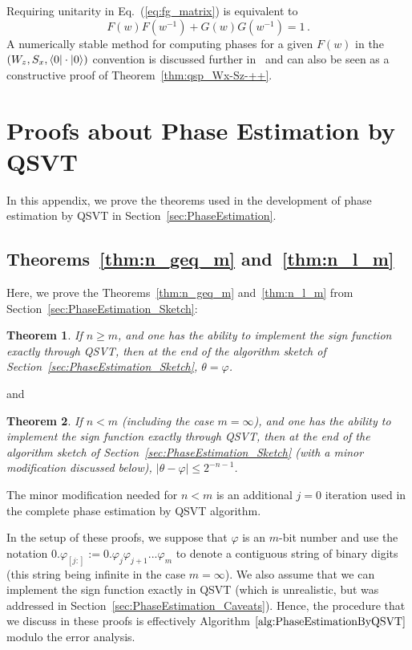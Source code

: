 \documentclass[aps,pra,showpacs,notitlepage,twocolumn,superscriptaddress,nofootinbib]{revtex4-1}
\newtheorem{theorem}{Theorem}
\newcommand{\be}{\begin{equation}}
\newcommand{\ee}{\end{equation}}
\begin{document}
Requiring unitarity in Eq.~(\ref{eq:fg_matrix}) is equivalent to 
\be
F(w)F(w^{-1}) + G(w)G(w^{-1}) = 1
\,.
\ee
A numerically stable method for computing phases for a given $F(w)$ in the $(W_z, S_x, \braket{0| \cdot |0})$ convention is discussed further in~\cite{chao2020finding} and can also be seen as a constructive proof of Theorem~\ref{thm:qsp_Wx-Sz-++}.






\section{Proofs about Phase Estimation by QSVT} \label{sec:PhaseEstimationProofs}
In this appendix, we prove the theorems used in the development of phase estimation by QSVT in Section~\ref{sec:PhaseEstimation}.

\subsection{Theorems~\ref{thm:n_geq_m} and~\ref{thm:n_l_m}} \label{sec:PhaseEstimation_m_n_Proofs}

Here, we prove the Theorems~\ref{thm:n_geq_m} and~\ref{thm:n_l_m} from Section~\ref{sec:PhaseEstimation_Sketch}:
\begingroup
\def\thetheorem{\ref{thm:n_geq_m}}
    \begin{theorem}
    If $n \geq m$, and one has the ability to implement the sign function exactly through QSVT, then at the end of the algorithm sketch of Section~\ref{sec:PhaseEstimation_Sketch}, $\theta = \varphi$. 
    \end{theorem}
\addtocounter{theorem}{-1}
\endgroup
and
\begingroup
\def\thetheorem{\ref{thm:n_l_m}}
    \begin{theorem}
    If $n < m$ (including the case $m=\infty$), and one has the ability to implement the sign function exactly through QSVT, then at the end of the algorithm sketch of Section~\ref{sec:PhaseEstimation_Sketch} (with a minor modification discussed below), $|\theta - \varphi| \leq 2^{-n-1}$. 
    \end{theorem}
\addtocounter{theorem}{-1}
\endgroup
\noindent The minor modification needed for $n<m$ is an additional $j=0$ iteration used in the complete phase estimation by QSVT algorithm.

In the setup of these proofs, we suppose that $\varphi$ is an $m$-bit number and use the notation $0.\varphi_{[j:]} := 0.\varphi_{j}\varphi_{j+1}...\varphi_{m}$ to denote a contiguous string of binary digits (this string being infinite in the case $m=\infty$). We also assume that we can implement the sign function exactly in QSVT (which is unrealistic, but was addressed in Section~\ref{sec:PhaseEstimation_Caveats}). Hence, the procedure that we discuss in these proofs is effectively Algorithm $\ref{alg:PhaseEstimationByQSVT}$ modulo the error analysis. 
\end{document}
